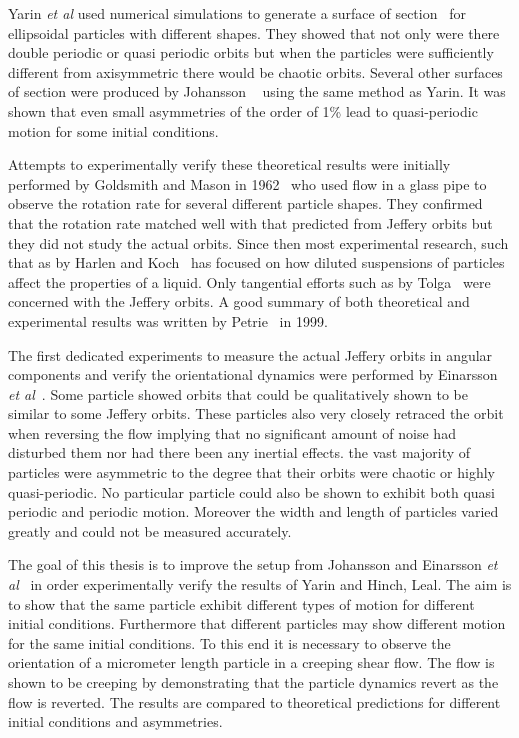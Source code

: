 Yarin \emph{et al} used numerical simulations to generate a surface of section~\cite{SurfaceOfSection} for ellipsoidal particles with different shapes. They showed that not only were there double periodic or quasi periodic orbits but when the particles were sufficiently different from axisymmetric there would be chaotic orbits. 
Several other surfaces of section were produced by Johansson ~\cite{AntonThesis} using the same method as Yarin. It was shown that even small asymmetries of the order of 1\% lead to quasi-periodic motion for some initial conditions.

Attempts to experimentally verify these theoretical results were initially performed by Goldsmith and Mason in 1962~\cite{Mason} who used flow in a glass pipe to observe the rotation rate for several different particle shapes. They confirmed that the rotation rate matched well with that predicted from Jeffery orbits but they did not study the actual orbits. Since then most experimental research, such that as by Harlen and Koch~\cite{fibersspension} has focused on how diluted suspensions of particles affect the properties of a liquid. Only tangential efforts such as by Tolga~\cite{Tolga} were concerned with the Jeffery orbits. A good summary of both theoretical and experimental results was written by Petrie~\cite{Petrie} in 1999.

The first dedicated experiments to measure the actual Jeffery orbits in angular components and verify the orientational dynamics were performed by Einarsson \emph{et al}~\cite{JonasExperiment}. Some particle showed orbits that could be qualitatively shown to be similar to some Jeffery orbits. These particles also very closely retraced the orbit when reversing the flow implying that no significant amount of noise had disturbed them nor had there been any inertial effects. the vast majority of particles were asymmetric to the degree that their orbits were chaotic or highly quasi-periodic. No particular particle could also be shown to exhibit both quasi periodic and periodic motion. Moreover the width and length of particles varied greatly and could not be measured accurately.

The goal of this thesis is to improve the setup from Johansson\cite{AntonThesis} and Einarsson \emph{et al}~\cite{JonasExperiment} in order experimentally verify the results of Yarin and Hinch, Leal\cite{Yarin, Leal}. The aim is to show that the same particle exhibit different types of motion for different initial conditions. Furthermore that different particles may show different motion for the same initial conditions. To this end it is necessary to observe the orientation of a micrometer length particle in a creeping shear flow. The flow is shown to be creeping by demonstrating that the particle dynamics revert as the flow is reverted. The results are compared to theoretical predictions for different initial conditions and asymmetries.

